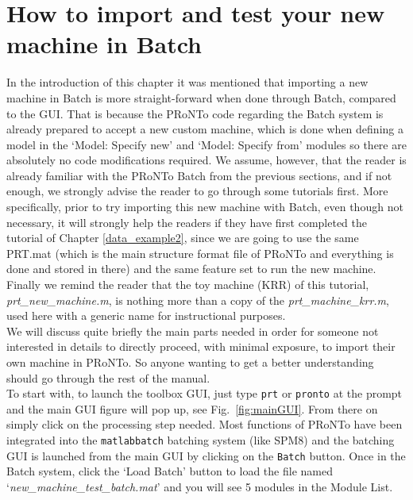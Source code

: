 \section{How to import and test your new machine in Batch}
\label{sec:new_machine_batch}

In the introduction of this chapter it was mentioned that importing a new machine in Batch is more straight-forward when done through Batch, compared to the GUI. That is because the PRoNTo code regarding the Batch system is already prepared to accept a new custom machine, which is done when defining a model in the `Model: Specify new' and `Model: Specify from' modules so there are absolutely no code modifications required. We assume, however, that the reader is already familiar with the PRoNTo Batch from the previous sections, and if not enough, we strongly advise the reader to go through some tutorials first. More specifically, prior to try importing this new machine with Batch, even though not necessary, it will strongly help the readers if they have first completed the tutorial of Chapter \ref{data_example2}, since we are going to use the same PRT.mat (which is the main structure format file of PRoNTo and everything is done and stored in there) and the same feature set to run the new machine. Finally we remind the reader that the toy machine (KRR) of this tutorial, \textit{prt\_new\_machine.m}, is nothing more than a copy of the \textit{prt\_machine\_krr.m}, used here with a generic name for instructional purposes.
\\

We will discuss quite briefly the main parts needed in order for someone not interested in details to directly proceed, with minimal exposure, to import their own machine in PRoNTo. So anyone wanting to get a better understanding should go through the rest of the manual.
\\

To start with, to launch the toolbox GUI, just type {\tt prt} or {\tt pronto} at the \matlab{} prompt and the main GUI figure will pop up, see Fig.~\ref{fig:mainGUI}. From there on simply click on the processing step needed. Most functions of PRoNTo have been integrated into the {\tt matlabbatch} batching system \cite{matlabbatch} (like SPM8) and the batching GUI is launched from the main GUI by clicking on the {\tt Batch} button. Once in the Batch system, click the `Load Batch' button to load the file named `\textit{new\_machine\_test\_batch.mat}' and you will see 5 modules in the Module List.
\\

